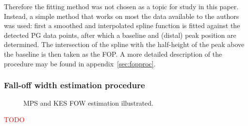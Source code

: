 \documentclass[a4paper,english]{article}
\begin{document}
Therefore the fitting method was not chosen as a topic for study in this paper. Instead, a simple method that works on most the data available to the authors was used: first a smoothed and interpolated spline function is fitted against the detected PG data points, after which a baseline and (distal) peak position are determined. The intersection of the spline with the half-height of the peak above the baseline is then taken as the FOP. A more detailed description of the procedure may be found in appendix~\ref{sec:fopproc}.

\subsubsection{Fall-off width estimation procedure}

\begin{figure}[htp]
  \centering
  \quad
  \caption{\label{FOWCOMP} MPS and KES FOW estimation illustrated.}
\end{figure}

\textcolor{red}{TODO}


\end{document}
